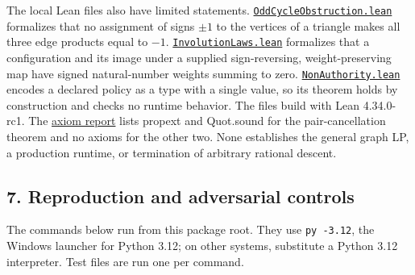 \documentclass[
  11pt,
]{article}
\newcommand{\passthrough}[1]{#1}
\begin{document}
The local Lean files also have limited statements.
\href{https://github.com/dbccpage/the_symbol_game/blob/main/education/documentation/030_pfp_proposal_fidelity_protocol_pfp/papers/symbol_game/001_pfp_discrete_cochain_retraction_and_toy_involutions/lean4/OddCycleObstruction.lean}{\mbox{\nolinkurl{OddCycleObstruction.lean}}}
formalizes that no assignment of signs \(\pm1\) to the vertices of a
triangle makes all three edge products equal to \(-1\).
\href{https://github.com/dbccpage/the_symbol_game/blob/main/education/documentation/030_pfp_proposal_fidelity_protocol_pfp/papers/symbol_game/001_pfp_discrete_cochain_retraction_and_toy_involutions/lean4/InvolutionLaws.lean}{\mbox{\nolinkurl{InvolutionLaws.lean}}}
formalizes that a configuration and its image under a supplied
sign-reversing, weight-preserving map have signed natural-number weights
summing to zero.
\href{https://github.com/dbccpage/the_symbol_game/blob/main/education/documentation/030_pfp_proposal_fidelity_protocol_pfp/papers/symbol_game/001_pfp_discrete_cochain_retraction_and_toy_involutions/lean4/NonAuthority.lean}{\mbox{\nolinkurl{NonAuthority.lean}}}
encodes a declared policy as a type with a single value, so its theorem
holds by construction and checks no runtime behavior. The files build
with Lean 4.34.0-rc1. The
\href{https://github.com/dbccpage/the_symbol_game/blob/main/education/documentation/030_pfp_proposal_fidelity_protocol_pfp/papers/symbol_game/001_pfp_discrete_cochain_retraction_and_toy_involutions/lean4/axiom_report.txt}{axiom
report} lists propext and Quot.sound for the pair-cancellation theorem
and no axioms for the other two. None establishes the general graph LP,
a production runtime, or termination of arbitrary rational descent.

\subsection{7. Reproduction and adversarial
controls}\label{reproduction-and-adversarial-controls}

The commands below run from this package root. They use
\passthrough{\lstinline!py -3.12!}, the Windows launcher for Python
3.12; on other systems, substitute a Python 3.12 interpreter. Test files
are run one per command.
\end{document}
